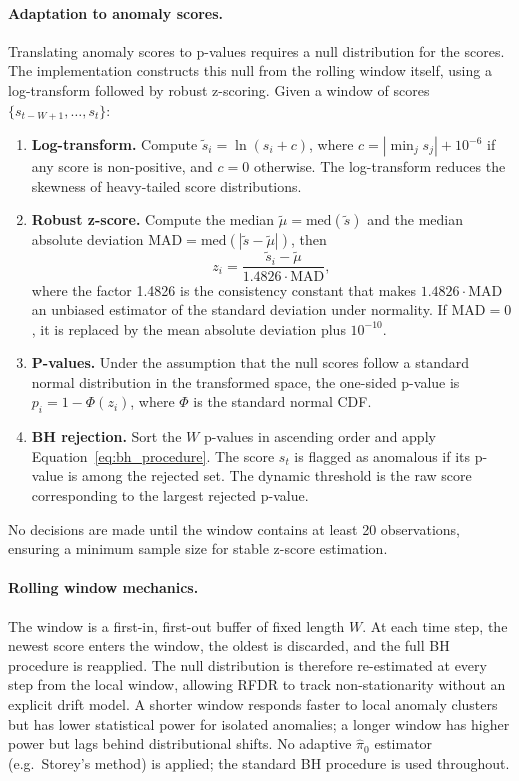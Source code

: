 \documentclass[11pt]{report}
\begin{document}
\paragraph{Adaptation to anomaly scores.}
Translating anomaly scores to p-values requires a null distribution for the scores. The implementation constructs this null from the rolling window itself, using a log-transform followed by robust z-scoring. Given a window of scores $\{s_{t-W+1}, \ldots, s_t\}$:
\begin{enumerate}
  \item \textbf{Log-transform.} Compute $\tilde{s}_i = \ln(s_i + c)$, where $c = |\min_j s_j| + 10^{-6}$ if any score is non-positive, and $c = 0$ otherwise. The log-transform reduces the skewness of heavy-tailed score distributions.
  \item \textbf{Robust z-score.} Compute the median $\tilde{\mu} = \mathrm{med}(\tilde{s})$ and the median absolute deviation $\mathrm{MAD} = \mathrm{med}(|\tilde{s} - \tilde{\mu}|)$, then
  \begin{equation}
    \label{eq:rfdr_zscore}
    z_i = \frac{\tilde{s}_i - \tilde{\mu}}{1.4826 \cdot \mathrm{MAD}},
  \end{equation}
  where the factor 1.4826 is the consistency constant that makes $1.4826 \cdot \mathrm{MAD}$ an unbiased estimator of the standard deviation under normality. If $\mathrm{MAD} = 0$, it is replaced by the mean absolute deviation plus $10^{-10}$.
  \item \textbf{P-values.} Under the assumption that the null scores follow a standard normal distribution in the transformed space, the one-sided p-value is $p_i = 1 - \Phi(z_i)$, where $\Phi$ is the standard normal CDF.
  \item \textbf{BH rejection.} Sort the $W$ p-values in ascending order and apply Equation~\eqref{eq:bh_procedure}. The score $s_t$ is flagged as anomalous if its p-value is among the rejected set. The dynamic threshold is the raw score corresponding to the largest rejected p-value.
\end{enumerate}

No decisions are made until the window contains at least 20 observations, ensuring a minimum sample size for stable z-score estimation.

\paragraph{Rolling window mechanics.}
The window is a first-in, first-out buffer of fixed length $W$. At each time step, the newest score enters the window, the oldest is discarded, and the full BH procedure is reapplied. The null distribution is therefore re-estimated at every step from the local window, allowing RFDR to track non-stationarity without an explicit drift model. A shorter window responds faster to local anomaly clusters but has lower statistical power for isolated anomalies; a longer window has higher power but lags behind distributional shifts.
No adaptive $\hat{\pi}_0$ estimator (e.g.\ Storey's method) is applied; the standard BH procedure is used throughout.
\end{document}
